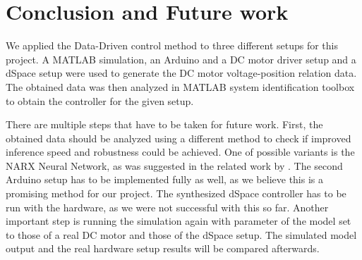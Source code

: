 \documentclass[]{final_report}
\begin{document}
\chapter{Conclusion and Future work}
We applied the Data-Driven control method to three different setups for this project. A MATLAB simulation, an Arduino and a DC motor driver setup and a dSpace setup were used to generate the DC motor voltage-position relation data. The obtained data was then analyzed in MATLAB system identification toolbox to obtain the controller for the given setup. 

There are multiple steps that have to be taken for future work. First, the obtained data should be analyzed using a different method to check if improved inference speed and robustness could be achieved. One of possible variants is the NARX Neural Network, as was suggested in the related work by \cite{naung2018a}. The second Arduino setup has to be implemented fully as well, as we believe this is a promising method for our project. The synthesized dSpace controller has to be run with the hardware, as we were not successful with this so far. Another important step is running the simulation again with parameter of the model set to those of a real DC motor and those of the dSpace setup. The simulated model output and the real hardware setup results will be compared afterwards.


\newpage

 

\label{endpage}
\end{document}
